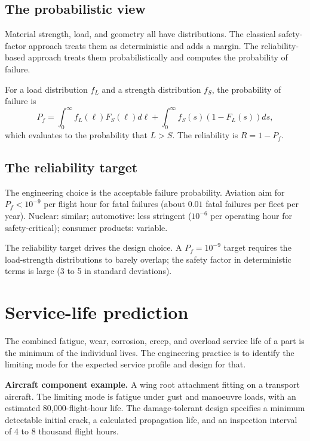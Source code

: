 \subsection{The probabilistic view}

Material strength, load, and geometry all have distributions. The classical safety-factor approach treats them as deterministic and adds a margin. The reliability-based approach treats them probabilistically and computes the probability of failure.

For a load distribution $f_L$ and a strength distribution $f_S$, the probability of failure is
\[
P_f = \int_0^\infty f_L(\ell) F_S(\ell) d\ell + \int_0^\infty f_S(s) (1 - F_L(s)) ds,
\]
which evaluates to the probability that $L > S$. The reliability is $R = 1 - P_f$.

\subsection{The reliability target}

The engineering choice is the acceptable failure probability. Aviation aim for $P_f < 10^{-9}$ per flight hour for fatal failures (about $0.01$ fatal failures per fleet per year). Nuclear: similar; automotive: less stringent ($10^{-6}$ per operating hour for safety-critical); consumer products: variable.

The reliability target drives the design choice. A $P_f = 10^{-9}$ target requires the load-strength distributions to barely overlap; the safety factor in deterministic terms is large (3 to 5 in standard deviations).

\section{Service-life prediction}

The combined fatigue, wear, corrosion, creep, and overload service life of a part is the minimum of the individual lives. The engineering practice is to identify the limiting mode for the expected service profile and design for that.

\textbf{Aircraft component example.} A wing root attachment fitting on a transport aircraft. The limiting mode is fatigue under gust and manoeuvre loads, with an estimated 80,000-flight-hour life. The damage-tolerant design specifies a minimum detectable initial crack, a calculated propagation life, and an inspection interval of 4 to 8 thousand flight hours.

